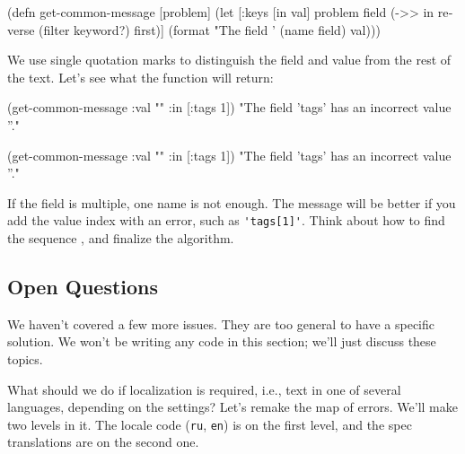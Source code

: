 \else

\begin{english}
  \begin{clojure}
(defn get-common-message
  [problem]
  (let [{:keys [in val]} problem
        field (->> in
                   reverse
                   (filter keyword?)
                   first)]
    (format "The field '%
            (name field) val)))
  \end{clojure}
\end{english}

\fi

We use single quotation marks to distinguish the field and value from the rest of the text. Let's see what the function will return:

\ifx\DEVICETYPE\MOBILE

\begin{english}
  \begin{clojure}
(get-common-message
  {:val "" :in [:tags 1]})
"The field 'tags' has
          an incorrect value ''."
  \end{clojure}
\end{english}

\else

\begin{english}
  \begin{clojure}
(get-common-message {:val "" :in [:tags 1]})
"The field 'tags' has an incorrect value ''."
  \end{clojure}
\end{english}

\fi

If the field is multiple, one name is not enough. The message will be better if you add the value index with an error, such as \verb|'tags[1]'|. Think about how to find the sequence , and finalize the algorithm.

\subsection{Open Questions}

We haven't covered a few more issues. They are too general to have a specific solution. We won't be writing any code in this section; we'll just discuss these topics.

What should we do if localization is required, i.e., text in one of several languages, depending on the settings? Let's remake the map of errors. We'll make two levels in it. The locale code (\verb|ru|, \verb|en|) is on the first level, and the spec translations are on the second one.

